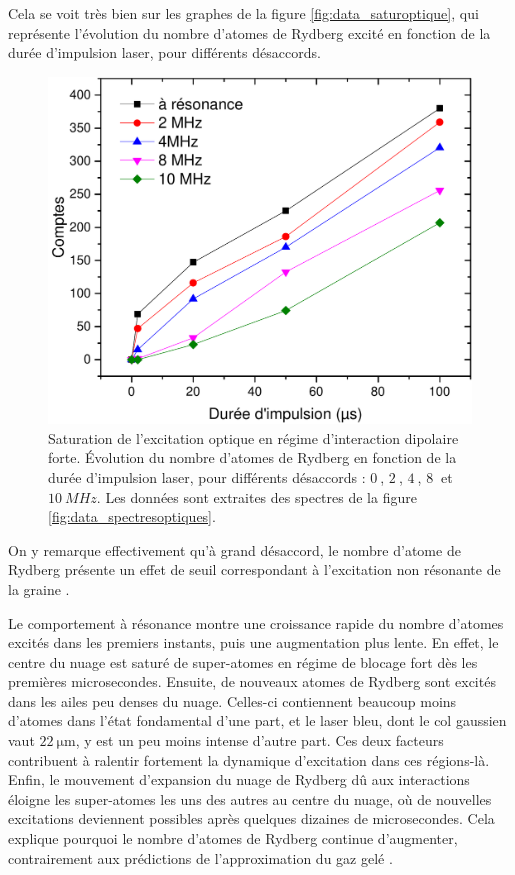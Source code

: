 Cela se voit très bien sur les graphes de la figure \eqref{fig:data_saturoptique}, qui représente l'évolution du nombre d'atomes de Rydberg excité en fonction de la durée d'impulsion laser, pour différents désaccords.
%
\begin{figure}[!h]
\centering
\includegraphics[width=.7\linewidth]{figures/low_l/satur_spectres_optiques_extract}
\caption[Saturation de l'excitation optique en régime d'interaction dipolaire forte]{Saturation de l'excitation optique en régime d'interaction dipolaire forte.
Évolution du nombre d'atomes de Rydberg en fonction de la durée d'impulsion laser, pour différents désaccords : $\SI{0}{}$, $\SI{2}{}$, $\SI{4}{}$, $\SI{8}{}$ et $\SI{10}{MHz}$.
Les données sont extraites des spectres de la figure \eqref{fig:data_spectresoptiques}.
}
\label{fig:data_saturoptique}
\end{figure}
%
On y remarque effectivement qu'à grand désaccord, le nombre d'atome de Rydberg présente un effet de seuil correspondant à l'excitation non résonante de la \og graine \fg{}.

Le comportement à résonance montre une croissance rapide du nombre d'atomes excités dans les premiers instants, puis une augmentation plus lente.
En effet, le centre du nuage est saturé de super-atomes en régime de blocage fort dès les premières microsecondes.
Ensuite, de nouveaux atomes de Rydberg sont excités dans les ailes peu denses du nuage.
Celles-ci contiennent beaucoup moins d'atomes dans l'état fondamental d'une part, et le laser bleu, dont le col gaussien vaut $\SI{22}{\um}$, y est un peu moins intense d'autre part.
Ces deux facteurs contribuent à ralentir fortement la dynamique d'excitation dans ces régions-là.
Enfin, le mouvement d'expansion du nuage de Rydberg dû aux interactions éloigne les super-atomes les uns des autres au centre du nuage, où de nouvelles excitations deviennent possibles après quelques dizaines de microsecondes.
Cela explique pourquoi le nombre d'atomes de Rydberg continue d'augmenter, contrairement aux prédictions de l'approximation du \og gaz gelé \fg{}.%

